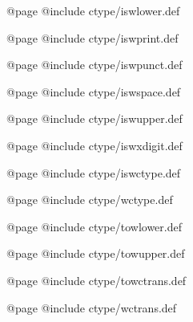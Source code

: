 @page
@include ctype/iswlower.def

@page
@include ctype/iswprint.def

@page
@include ctype/iswpunct.def

@page
@include ctype/iswspace.def

@page
@include ctype/iswupper.def

@page
@include ctype/iswxdigit.def

@page
@include ctype/iswctype.def

@page
@include ctype/wctype.def

@page
@include ctype/towlower.def

@page
@include ctype/towupper.def

@page
@include ctype/towctrans.def

@page
@include ctype/wctrans.def

